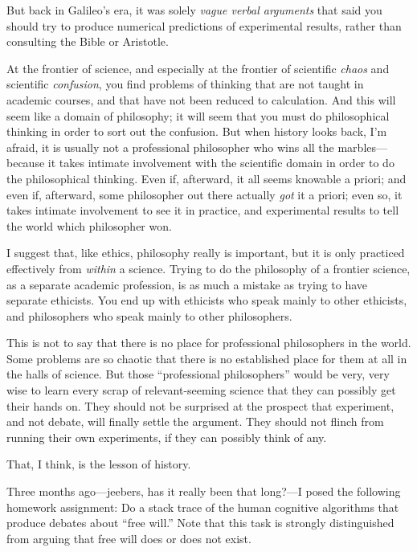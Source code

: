 {
 But back in Galileo's era, it was solely
\textit{vague verbal arguments} that said you should try to produce
numerical predictions of experimental results, rather than consulting
the Bible or Aristotle.}

{
 At the frontier of science, and especially at the frontier of
scientific \textit{chaos} and scientific \textit{confusion}, you find
problems of thinking that are not taught in academic courses, and that
have not been reduced to calculation. And this will seem like a domain
of philosophy; it will seem that you must do philosophical thinking in
order to sort out the confusion. But when history looks back,
I'm afraid, it is usually not a professional
philosopher who wins all the marbles---because it takes intimate
involvement with the scientific domain in order to do the philosophical
thinking. Even if, afterward, it all seems knowable a priori; and even
if, afterward, some philosopher out there actually \textit{got} it a
priori; even so, it takes intimate involvement to see it in practice,
and experimental results to tell the world which philosopher won.}

{
 I suggest that, like ethics, philosophy really is important, but
it is only practiced effectively from \textit{within} a science. Trying
to do the philosophy of a frontier science, as a separate academic
profession, is as much a mistake as trying to have separate ethicists.
You end up with ethicists who speak mainly to other ethicists, and
philosophers who speak mainly to other philosophers.}

{
 This is not to say that there is no place for professional
philosophers in the world. Some problems are so chaotic that there is
no established place for them at all in the halls of science. But those
``professional philosophers'' would
be very, very wise to learn every scrap of relevant-seeming science
that they can possibly get their hands on. They should not be surprised
at the prospect that experiment, and not debate, will finally settle
the argument. They should not flinch from running their own
experiments, if they can possibly think of any.}

{
 That, I think, is the lesson of history.}

\myendsectiontext


{
 Three months ago---jeebers, has it really been that long?---I
posed the following homework assignment: Do a stack trace of the human
cognitive algorithms that produce debates about ``free
will.'' Note that this task is strongly distinguished
from arguing that free will does or does not exist. }


